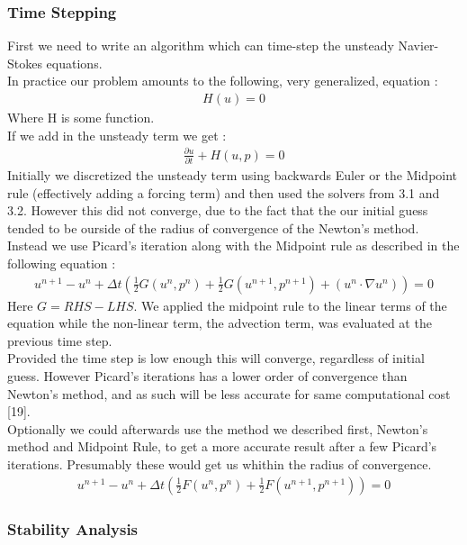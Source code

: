 \documentclass[11pt,twoside,a4paper]{article}
\begin{document}
\subsubsection{Time Stepping}
First we need to write an algorithm which can time-step the unsteady Navier-Stokes equations.\\
In practice our problem amounts to the following, very generalized, equation :
\begin{align*}
H(u) = 0
\end{align*}
Where H is some function.\\
If we add in the unsteady term we get :
\begin{align}
\frac{\partial u}{\partial t} + H(u,p) = 0
\end{align}
Initially we discretized the unsteady term using backwards Euler or the Midpoint rule (effectively adding a forcing term) and then used the solvers from 3.1 and 3.2. However this did not converge, due to the fact that the our initial guess tended to be ourside of the radius of convergence of the Newton's method.\\
Instead we use Picard's iteration along with the Midpoint rule as described in the following equation :
\begin{align}
u^{n+1} - u^n + \Delta t (\frac{1}{2}G(u^n,p^n) + \frac{1}{2} G(u^{n+1},p^{n+1}) + ( u^n \cdot \nabla u^n) ) = 0
\end{align}
Here $G = RHS - LHS $. We applied the midpoint rule to the linear terms of the equation while the non-linear term, the advection term, was evaluated at the previous time step.\\
Provided the time step is low enough this will converge, regardless of initial guess. However Picard's iterations has a lower order of convergence than Newton's method, and as such will be less accurate for same computational cost [19].\\
Optionally we could afterwards use the method we described first, Newton's method and Midpoint Rule, to get a more accurate result after a few Picard's iterations. Presumably these would get us whithin the radius of convergence.
\begin{align}
u^{n+1} - u^n + \Delta t (\frac{1}{2}F(u^n,p^n) + \frac{1}{2} F(u^{n+1},p^{n+1})) = 0
\end{align}

\subsubsection{Stability Analysis}
\end{document}

